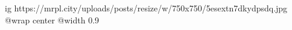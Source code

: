  
 
 
 
 

\ifcmt
  ig https://mrpl.city/uploads/posts/resize/w/750x750/5esextn7dkydpsdq.jpg
  @wrap center
  @width 0.9
\fi
